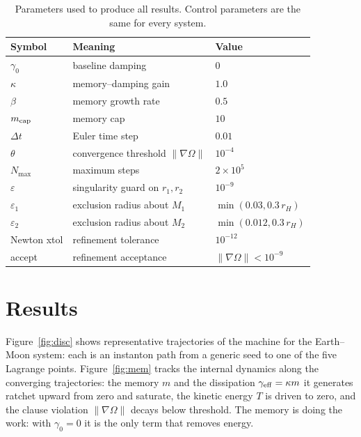 \documentclass[aip,preprint,amsmath,amssymb,floatfix]{revtex4-2}
\begin{document}
\begin{table}[ht]
\centering
\caption{Parameters used to produce all results. Control parameters are the same
for every system.}
\label{tab:params}
\begin{tabular}{lll}
\toprule
Symbol & Meaning & Value\\
\midrule
$\gamma_0$ & baseline damping & $0$\\
$\kappa$ & memory--damping gain & $1.0$\\
$\beta$ & memory growth rate & $0.5$\\
$m_{\rm cap}$ & memory cap & $10$\\
$\Delta t$ & Euler time step & $0.01$\\
$\theta$ & convergence threshold $\lVert\nabla\Omega\rVert$ & $10^{-4}$\\
$N_{\max}$ & maximum steps & $2\times10^{5}$\\
$\varepsilon$ & singularity guard on $r_1,r_2$ & $10^{-9}$\\
$\varepsilon_1$ & exclusion radius about $M_1$ & $\min(0.03,0.3\,r_H)$\\
$\varepsilon_2$ & exclusion radius about $M_2$ & $\min(0.012,0.3\,r_H)$\\
Newton xtol & refinement tolerance & $10^{-12}$\\
accept & refinement acceptance & $\lVert\nabla\Omega\rVert<10^{-9}$\\
\bottomrule
\end{tabular}
\end{table}

\section{Results}\label{sec:results}

Figure~\ref{fig:disc} shows representative trajectories of the machine for the
Earth--Moon system: each is an instanton path from a generic seed to one of the
five Lagrange points. Figure~\ref{fig:mem} tracks the internal dynamics along the
converging trajectories: the memory $m$ and the dissipation $\gamma_{\rm eff}=
\kappa m$ it generates ratchet upward from zero and saturate, the kinetic energy
$T$ is driven to zero, and the clause violation $\lVert\nabla\Omega\rVert$ decays
below threshold. The memory is doing the work: with $\gamma_0=0$ it is the only
term that removes energy.
\end{document}
